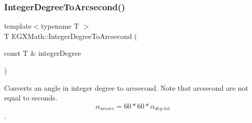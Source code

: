 \subsubsection{\texorpdfstring{Integer\+Degree\+To\+Arcsecond()}{IntegerDegreeToArcsecond()}}
{\footnotesize\ttfamily template$<$typename T $>$ \\
T E\+G\+X\+Math\+::\+Integer\+Degree\+To\+Arcsecond (\begin{DoxyParamCaption}\item[{const T \&}]{integer\+Degree }\end{DoxyParamCaption})}



Converts an angle in integer degree to arcsecond. Note that arcsecond are not equal to seconds. \[\alpha_{arcsec}=60 * 60 * \alpha_{deg\ int}\]. 

